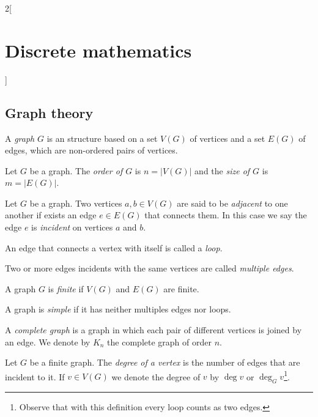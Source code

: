 \documentclass[../../../main.tex]{subfiles}
\begin{document}
\begin{multicols}{2}[\section{Discrete mathematics}]
    \subsection{Graph theory}
    \begin{definition}
        A \textit{graph} $G$ is an structure based on a set $V(G)$ of vertices and a set $E(G)$ of edges, which are non-ordered pairs of vertices.
    \end{definition}
    \begin{definition}
        Let $G$ be a graph. The \textit{order of $G$} is $n=|V(G)|$ and the \textit{size of $G$} is $m=|E(G)|$.
    \end{definition}
    \begin{definition}
        Let $G$ be a graph. Two vertices $a,b\in V(G)$ are said to be \textit{adjacent} to one another if exists an edge $e\in E(G)$ that connects them. In this case we say the edge $e$ is \textit{incident} on vertices $a$ and $b$.
    \end{definition}
    \begin{definition}
        An edge that connects a vertex with itself is called a \textit{loop}.
    \end{definition}
    \begin{definition}
        Two or more edges incidents with the same vertices are called \textit{multiple edges}.
    \end{definition}
    \begin{definition}
        A graph $G$ is \textit{finite} if $V(G)$ and $E(G)$ are finite.
    \end{definition}
    \begin{definition}
        A graph is \textit{simple} if it has neither multiples edges nor loops.
    \end{definition}
    \begin{definition}
        A \textit{complete graph} is a graph in which each pair of different vertices is joined by an edge. We denote by $K_n$ the complete graph of order $n$.
    \end{definition}
    \begin{definition}
        Let $G$ be a finite graph. The \textit{degree of a vertex} is the number of edges that are incident to it. If $v\in V(G)$ we denote the degree of $v$ by $\deg v$ or $\deg_Gv$\footnote{Observe that with this definition every loop counts as two edges.}.
    \end{definition}
    \begin{lemma}

\end{lemma}
\end{multicols}
\end{document}
